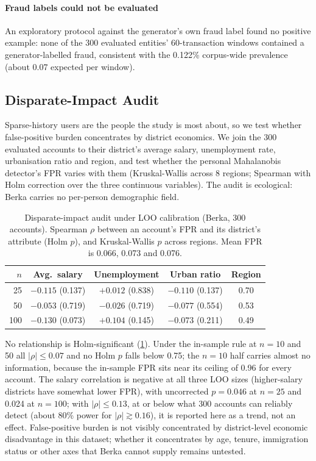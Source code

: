 \paragraph{Fraud labels could not be evaluated}
An exploratory protocol against the generator's own fraud label found no positive example: none of the 300 evaluated entities' 60-transaction windows contained a generator-labelled fraud, consistent with the 0.122\% corpus-wide prevalence (about 0.07 expected per window).

\subsection{Disparate-Impact Audit}\label{sec:audit}

Sparse-history users are the people the study is most about, so we test whether false-positive burden concentrates by district economics. We join the 300 evaluated accounts to their district's average salary, unemployment rate, urbanisation ratio and region, and test whether the personal Mahalanobis detector's FPR varies with them (Kruskal-Wallis across 8 regions; Spearman with Holm correction over the three continuous variables). The audit is ecological: Berka carries no per-person demographic field.

\begin{table}[!t]
\caption{Disparate-impact audit under LOO calibration (Berka, 300 accounts). Spearman $\rho$ between an account's FPR and its district's attribute (Holm $p$), and Kruskal-Wallis $p$ across regions. Mean FPR is 0.066, 0.073 and 0.076.}
\label{tab:audit}
\centering\footnotesize\setlength{\tabcolsep}{3pt}
\begin{tabular}{r ccc c}
\toprule
$n$ & Avg.\ salary & Unemployment & Urban ratio & Region \\
\midrule
25  & $-0.115$ (0.137) & $+0.012$ (0.838) & $-0.110$ (0.137) & 0.70 \\
50  & $-0.053$ (0.719) & $-0.026$ (0.719) & $-0.077$ (0.554) & 0.53 \\
100 & $-0.130$ (0.073) & $+0.104$ (0.145) & $-0.073$ (0.211) & 0.49 \\
\bottomrule
\end{tabular}
\end{table}

No relationship is Holm-significant (\cref{tab:audit}). Under the in-sample rule at $n=10$ and 50 all $|\rho|\le0.07$ and no Holm $p$ falls below 0.75; the $n=10$ half carries almost no information, because the in-sample FPR sits near its ceiling of 0.96 for every account. The salary correlation is negative at all three LOO sizes (higher-salary districts have somewhat lower FPR), with uncorrected $p=0.046$ at $n=25$ and 0.024 at $n=100$; with $|\rho|\le0.13$, at or below what 300 accounts can reliably detect (about 80\% power for $|\rho|\gtrsim0.16$), it is reported here as a trend, not an effect. False-positive burden is not visibly concentrated by district-level economic disadvantage in this dataset; whether it concentrates by age, tenure, immigration status or other axes that Berka cannot supply remains untested.
